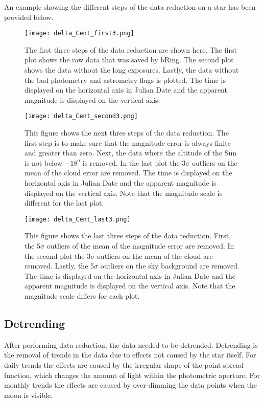 \documentclass{aa}
\begin{document}
An example showing the different steps of the data reduction on a star has been provided below.

\begin{figure}
    \centering
    \texttt{[image: delta\_Cent\_first3.png]}
    \caption{The first three steps of the data reduction are shown here. The first plot shows the raw data that was saved by bRing. The second plot shows the data without the long exposures. Lastly, the data without the bad photometry and astrometry flags is plotted. The time is displayed on the horizontal axis in Julian Date and the apparent magnitude is displayed on the vertical axis.}
    \label{deltaCen1}
\end{figure}
\begin{figure}
    \centering
    \texttt{[image: delta\_Cent\_second3.png]}
    \caption{This figure shows the next three steps of the data reduction. The first step is to make sure that the magnitude error is always finite and greater than zero. Next, the data where the altitude of the Sun is not below $-18^o$ is removed. In the last plot the 3$\sigma$ outliers on the mean of the cloud error are removed. The time is displayed on the horizontal axis in Julian Date and the apparent magnitude is displayed on the vertical axis. Note that the magnitude scale is different for the last plot.}
    \label{deltaCen2}
\end{figure}
\begin{figure}
    \centering
    \texttt{[image: delta\_Cent\_last3.png]}
    \caption{This figure shows the last three steps of the data reduction. First, the 5$\sigma$ outliers of the mean of the magnitude error are removed. In the second plot the 3$\sigma$ outliers on the mean of the cloud are removed. Lastly, the 5$\sigma$ outliers on the sky background are removed. The time is displayed on the horizontal axis in Julian Date and the apparent magnitude is displayed on the vertical axis. Note that the magnitude scale differs for each plot.}
    \label{deltaCen3}
\end{figure}


\subsection{Detrending}
After performing data reduction, the data needed to be detrended. Detrending is the removal of trends in the data due to effects not caused by the star itself. For daily trends the effects are caused by the irregular shape of the point spread function, which changes the amount of light within the photometric aperture. For monthly trends the effects are caused by over-dimming the data points when the moon is visible.
\end{document}
